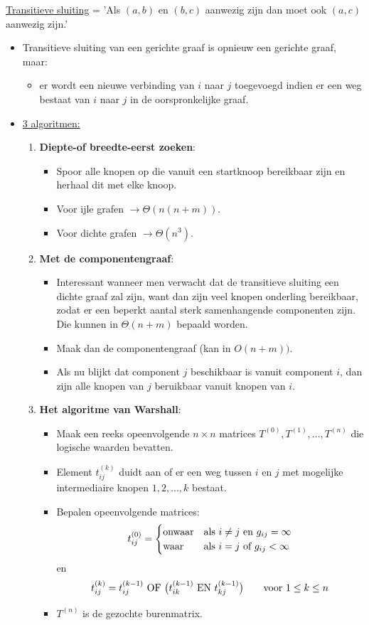 \underline{Transitieve sluiting} = 'Als $(a, b)$ en $(b, c)$ aanwezig zijn dan moet ook $(a, c)$ aanwezig zijn.'

\begin{itemize}
	\item Transitieve sluiting van een gerichte graaf is opnieuw een gerichte graaf, maar:
	\begin{itemize}
		\item er wordt een nieuwe verbinding van $i$ naar $j$ toegevoegd indien er een weg bestaat van $i$ naar $j$ in de oorspronkelijke graaf.
	\end{itemize}
	\item \underline{3 algoritmen:}
	\begin{enumerate}
		\item \textbf{Diepte-of breedte-eerst zoeken}: 
				\begin{itemize}
					\item Spoor alle knopen op die vanuit een startknoop bereikbaar zijn en herhaal dit met elke knoop.
					\item Voor ijle grafen $\rightarrow \Theta(n(n + m))$.
					\item Voor dichte grafen $\rightarrow \Theta(n^3)$.
				\end{itemize}
		\item \textbf{Met de componentengraaf}:
				\begin{itemize}
					\item Interessant wanneer men verwacht dat de transitieve sluiting een dichte graaf zal zijn, want dan zijn veel knopen onderling bereikbaar, zodat er een beperkt aantal sterk samenhangende componenten zijn. Die kunnen in $\Theta(n + m)$ bepaald worden.
					\item Maak dan de componentengraaf (kan in $O(n + m))$.
					\item Als nu blijkt dat component $j$ beschikbaar is vanuit component $i$, dan zijn alle knopen van $j$ beruikbaar vanuit knopen van $i$.
				\end{itemize}
		\item \textbf{Het algoritme van Warshall}:
				\begin{itemize}
					\item Maak een reeks opeenvolgende $n \times n$ matrices $T^{(0)},T^{(1)},...,T^{(n)}$ die logische waarden bevatten.
					\item Element $t_{ij}^{(k)}$ duidt aan of er een weg tussen $i$ en $j$ met mogelijke intermediaire knopen $1, 2, ..., k$ bestaat.
					\item Bepalen opeenvolgende matrices:
					$$t_{ij}^{(0)} = 
					\begin{cases}
						\hbox{onwaar} & \hbox{als } i \neq j \hbox{ en } g_{ij} = \infty\\
						\hbox{waar}   & \hbox{als } i = j \hbox{ of } g_{ij} < \infty
					\end{cases}$$
					en
					$$
						t_{ij}^{(k)} = t_{ij}^{(k - 1)} \hbox{ OF } \big(t_{ik}^{(k - 1)} \hbox{ EN } t_{kj}^{(k - 1)}\big) \qquad \hbox{voor } 1 \leq k \leq n
					$$
					\item $T^{(n)}$ is de gezochte burenmatrix.
				\end{itemize}
				
	\end{enumerate}
\end{itemize}